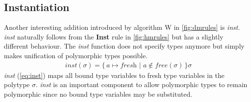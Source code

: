 \documentclass[11pt,oneside,a4paper]{report}
\begin{document}
\subsection{Instantiation}
Another interesting addition introduced by algorithm W in \autoref{fig:dmrules} is \textit{inst}.
\textit{inst} naturally follows from the \textbf{Inst} rule in \autoref{fig:hmrules} but has a slightly different behaviour.
The \textit{inst} function does not specify types anymore but simply makes unification of polymorphic types possible.
\begin{align}
    &\textit{inst}(\sigma) = \{ \, a \mapsto \textit{fresh} \,\,|\,\, a \notin \textit{free}(\sigma) \, \}\sigma
    \label{eq:inst}
\end{align}
\textit{inst} (\autoref{eq:inst}) maps all bound type variables to fresh type variables in the polytype $\sigma$.
\textit{inst} is an important component to allow polymorphic types to remain polymorphic since no bound type variables may be substituted.
\end{document}
